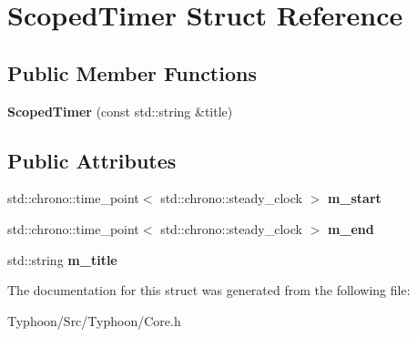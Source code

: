 \hypertarget{struct_scoped_timer}{}\section{Scoped\+Timer Struct Reference}
\label{struct_scoped_timer}
\subsection*{Public Member Functions}
\begin{DoxyCompactItemize}
\item 
\mbox{\label{struct_scoped_timer_a4ea3b402c1321f1339b26cc2220e2519}} 
{\bfseries Scoped\+Timer} (const std\+::string \&title)
\end{DoxyCompactItemize}
\subsection*{Public Attributes}
\begin{DoxyCompactItemize}
\item 
\mbox{\label{struct_scoped_timer_a512a748237cf2e6ca338e34158b1c3a9}} 
std\+::chrono\+::time\+\_\+point$<$ std\+::chrono\+::steady\+\_\+clock $>$ {\bfseries m\+\_\+start}
\item 
\mbox{\label{struct_scoped_timer_ab2bf5f5e94d773101098f575e5c67785}} 
std\+::chrono\+::time\+\_\+point$<$ std\+::chrono\+::steady\+\_\+clock $>$ {\bfseries m\+\_\+end}
\item 
\mbox{\label{struct_scoped_timer_a4da45b31f770659f8c295054f1248703}} 
std\+::string {\bfseries m\+\_\+title}
\end{DoxyCompactItemize}


The documentation for this struct was generated from the following file\+:\begin{DoxyCompactItemize}
\item 
Typhoon/\+Src/\+Typhoon/Core.\+h\end{DoxyCompactItemize}
